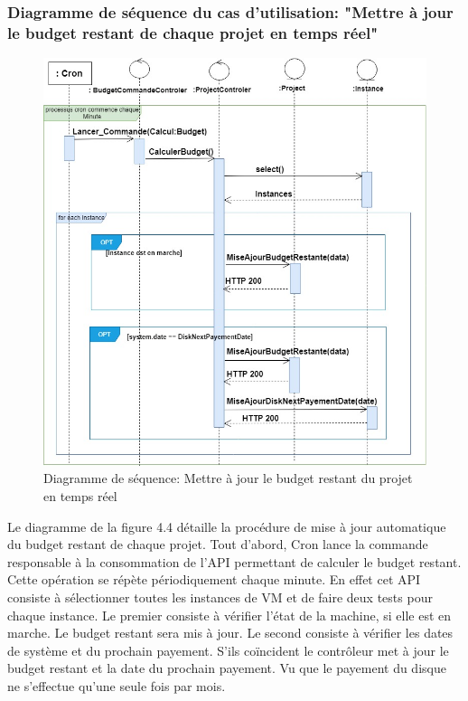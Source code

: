\subsubsection{Diagramme de séquence du cas d'utilisation: "Mettre à jour  le budget restant de chaque projet en temps réel"}

\begin{figure}[H]
	\centering
	\includegraphics[scale=0.54]{budget2.jpg}
	\caption{Diagramme de séquence: Mettre à jour le budget restant du projet en temps réel }
	\label{Diagramme de séquence: Mettre à jour le budget restant du projet en temps réel }
\end{figure}
Le diagramme de la figure 4.4 détaille la procédure de mise à jour automatique du budget restant de chaque projet. Tout d'abord, Cron lance la commande responsable à la consommation de l'API permettant de calculer le budget restant. Cette opération se répète périodiquement chaque minute. En effet  
cet API consiste à sélectionner toutes les instances de VM et  de faire deux tests pour chaque instance. 
Le premier consiste à vérifier l'état de la machine, si elle est en marche. Le budget restant sera mis à jour. 
Le second consiste à vérifier les dates de système et du prochain payement. S'ils coïncident  le contrôleur  met à jour le budget restant et la date du prochain payement.  Vu que le payement du disque ne s'effectue qu'une seule fois par mois.    
